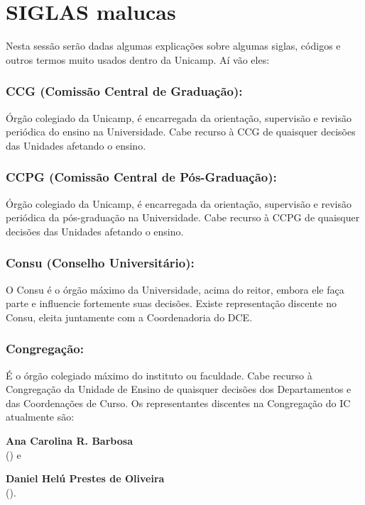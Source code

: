 
\section{SIGLAS malucas}

Nesta sessão serão dadas algumas explicações sobre algumas siglas, códigos e
outros termos muito usados dentro da Unicamp. Aí vão eles:

\subsubsection{CCG (Comissão Central de Graduação):} Órgão colegiado da
Unicamp, é encarregada da orientação, supervisão e revisão periódica do ensino
na Universidade. Cabe recurso à CCG de quaisquer decisões das Unidades afetando
o ensino.

\subsubsection{CCPG (Comissão Central de Pós-Graduação):} Órgão colegiado da
Unicamp, é encarregada da orientação, supervisão e revisão periódica da
pós-graduação na Universidade. Cabe recurso à CCPG de quaisquer decisões das
Unidades afetando o ensino.

\subsubsection{Consu (Conselho Universitário):} O Consu é o órgão máximo da
Universidade, acima do reitor, embora ele faça parte e influencie fortemente
suas decisões.  Existe representação discente no Consu, eleita juntamente com a
Coordenadoria do DCE.

\subsubsection{Congregação:} É o órgão colegiado máximo do instituto ou
faculdade.  Cabe recurso à Congregação da Unidade de Ensino de quaisquer
decisões dos Departamentos e das Coordenações de Curso. Os representantes
discentes na Congregação do IC atualmente são:

\begin{compactitemize}
\item \textbf{Ana Carolina R. Barbosa}
  \\() e
\item \textbf{Daniel Helú Prestes de Oliveira}
  \\().
\end{compactitemize}

